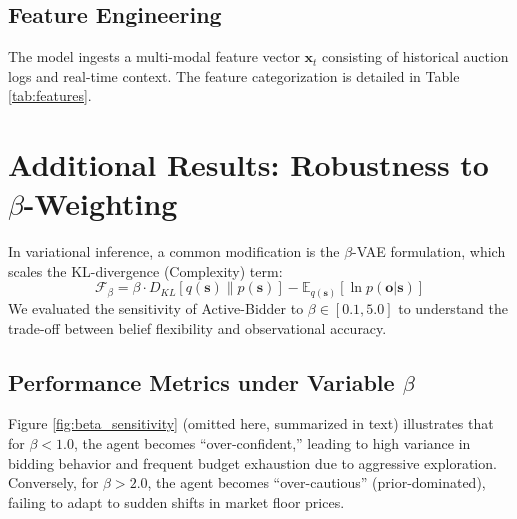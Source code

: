 \subsection{Feature Engineering}
The model ingests a multi-modal feature vector $\mathbf{x}_t$ consisting of historical auction logs and real-time context. The feature categorization is detailed in Table \ref{tab:features}.

\begin{table}[h]
\centering
\caption{Feature Space for the Generative Model.}
\label{tab:features}
%
\end{table}

\section{Additional Results: Robustness to $\beta$-Weighting}
\label{appendix:results}

In variational inference, a common modification is the $\beta$-VAE formulation, which scales the KL-divergence (Complexity) term:
\begin{equation}
    \mathcal{F}_\beta = \beta \cdot D_{KL}[q(\mathbf{s}) \| p(\mathbf{s})] - \mathbb{E}_{q(\mathbf{s})}[\ln p(\mathbf{o}|\mathbf{s})]
\end{equation}
We evaluated the sensitivity of Active-Bidder to $\beta \in [0.1, 5.0]$ to understand the trade-off between belief flexibility and observational accuracy.

\subsection{Performance Metrics under Variable $\beta$}
Figure \ref{fig:beta_sensitivity} (omitted here, summarized in text) illustrates that for $\beta < 1.0$, the agent becomes ``over-confident,'' leading to high variance in bidding behavior and frequent budget exhaustion due to aggressive exploration. Conversely, for $\beta > 2.0$, the agent becomes ``over-cautious'' (prior-dominated), failing to adapt to sudden shifts in market floor prices.

